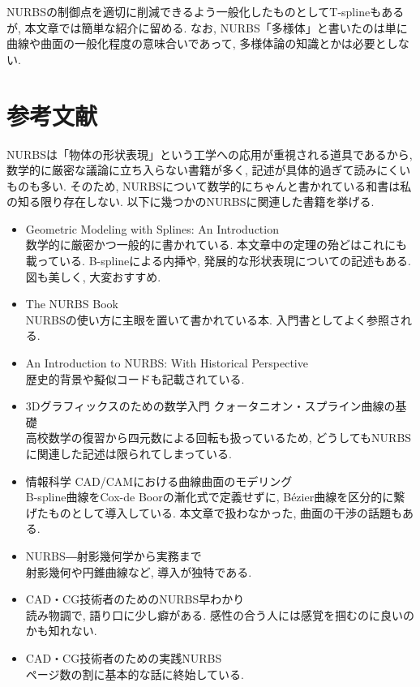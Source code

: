 \documentclass{jsarticle}
\theoremstyle{definition}%
\begin{document}


NURBSの制御点を適切に削減できるよう一般化したものとしてT-splineもあるが, 本文章では簡単な紹介に留める.
なお, NURBS「多様体」と書いたのは単に曲線や曲面の一般化程度の意味合いであって, 多様体論の知識とかは必要としない.

\section*{参考文献}
NURBSは「物体の形状表現」という工学への応用が重視される道具であるから, 数学的に厳密な議論に立ち入らない書籍が多く, 記述が具体的過ぎて読みにくいものも多い.
そのため, NURBSについて数学的にちゃんと書かれている和書は私の知る限り存在しない.
以下に幾つかのNURBSに関連した書籍を挙げる.
\begin{itemize}
    \item Geometric Modeling with Splines: An Introduction \\
    数学的に厳密かつ一般的に書かれている.
    本文章中の定理の殆どはこれにも載っている.
    B-splineによる内挿や, 発展的な形状表現についての記述もある.
    図も美しく, 大変おすすめ.
    \item The NURBS Book \\
    NURBSの使い方に主眼を置いて書かれている本. 入門書としてよく参照される.
    \item An Introduction to NURBS: With Historical Perspective \\
    歴史的背景や擬似コードも記載されている.
    \item 3Dグラフィックスのための数学入門 クォータニオン・スプライン曲線の基礎 \\
    高校数学の復習から四元数による回転も扱っているため, どうしてもNURBSに関連した記述は限られてしまっている.
    \item 情報科学 CAD/CAMにおける曲線曲面のモデリング \\
    B-spline曲線をCox-de Boorの漸化式で定義せずに, B\'{e}zier曲線を区分的に繋げたものとして導入している.
    本文章で扱わなかった, 曲面の干渉の話題もある.
    \item NURBS―射影幾何学から実務まで \\
    射影幾何や円錐曲線など, 導入が独特である.
    \item CAD・CG技術者のためのNURBS早わかり \\
    読み物調で, 語り口に少し癖がある.
    感性の合う人には感覚を掴むのに良いのかも知れない.
    \item CAD・CG技術者のための実践NURBS \\
    ページ数の割に基本的な話に終始している.
\end{itemize}
\end{document}
